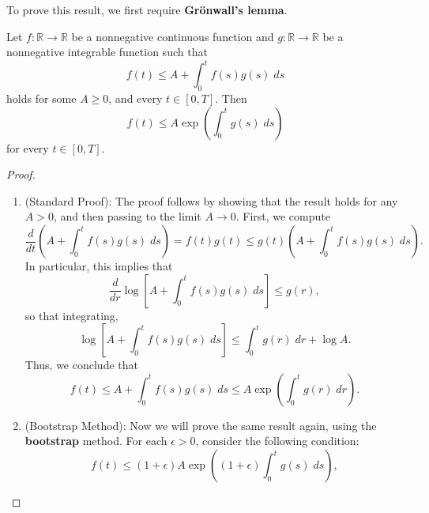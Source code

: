 \documentclass{article}
\begin{document}
To prove this result, we first require \textbf{Gr\"onwall's lemma}. 

\begin{lemma}
	Let $f: \mathbb{R} \to \mathbb{R}$ be a nonnegative continuous function and $g: \mathbb{R} \to \mathbb{R}$ be a nonnegative integrable function such that 
	\begin{equation*}
		f(t) \leq A + \int_{0}^{t}f(s)g(s)\;ds
	\end{equation*}
	holds for some $A \geq 0$, and every $t \in [0,T]$. Then 
	\begin{equation*}
		f(t) \leq A \exp\left(\int_{0}^{t}g(s)\;ds\right)
	\end{equation*}
	for every $t \in [0,T]$. 
\end{lemma}
\begin{proof}
	$ $\newline \vspace{-0.65cm}
	\begin{enumerate}[itemsep =-2pt,label = (\arabic{*})]
		\item (Standard Proof): The proof follows by showing that the result holds for any $A > 0$, and then passing to the limit $A \to 0$. First, we compute 
		\begin{equation*}
			\frac{d}{dt}\left(A + \int_{0}^{t}f(s)g(s)\;ds\right) = f(t)g(t) \leq g(t)\left(A + \int_{0}^{t}f(s)g(s)\;ds\right). 
		\end{equation*}
		In particular, this implies that 
		\begin{equation*}
			\frac{d}{dr}\log\left[A + \int_{0}^{t}f(s)g(s)\;ds\right] \leq g(r), 
		\end{equation*}
		so that integrating, 
		\begin{equation*}
			\log\left[A + \int_{0}^{t}f(s)g(s)\;ds\right] \leq \int_{0}^{t}g(r)\;dr + \log{A}. 
		\end{equation*}
		Thus, we conclude that 
		\begin{equation*}
			f(t) \leq A + \int_{0}^{t}f(s)g(s)\;ds \leq A\exp\left(\int_{0}^{t}g(r)\;dr\right). 
		\end{equation*}
		\item (Bootstrap Method): Now we will prove the same result again, using the \textbf{bootstrap} method. For each $\epsilon > 0$, consider the following condition: 
		\begin{equation*}
			f(t) \leq (1 + \epsilon)A\exp\left((1 + \epsilon)\int_{0}^{t}g(s)\;ds\right), 
			\tag{$\star$}
		\end{equation*}

\end{enumerate}
\end{proof}
\end{document}
